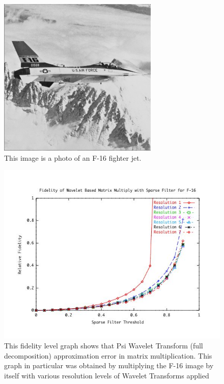 \begin{figure}[ht]
\begin{center}\includegraphics [width=3in]{f16.jpg}\end{center}
\caption{This image is a photo of an F-16 fighter jet.}
\label{imagef16}
\end{figure}
\begin{figure}[ht]
\begin{center}\includegraphics [width=5in]{f16resultsA.jpg}\end{center}
\caption{This fidelity level graph shows that Psi Wavelet Transform (full decomposition) approximation error in matrix multiplication.  This graph in particular was obtained by multiplying the F-16 image by itself with various resolution levels of Wavelet Transforms applied  }
\label{imagef16Fidelity}

\end{figure}

